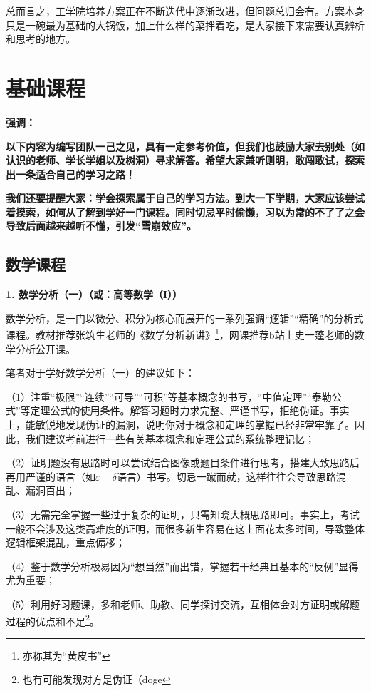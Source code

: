 \documentclass[11pt,oneside]{book}
\begin{document}
总而言之，工学院培养方案正在不断迭代中逐渐改进，但问题总归会有。方案本身只是一碗最为基础的大锅饭，加上什么样的菜拌着吃，是大家接下来需要认真辨析和思考的地方。


\section{基础课程}
\textbf{强调：}

\textbf{以下内容为编写团队一己之见，具有一定参考价值，但我们也鼓励大家去别处（如认识的老师、学长学姐以及树洞）寻求解答。希望大家兼听则明，敢闯敢试，探索出一条适合自己的学习之路！}

\textbf{我们还要提醒大家：学会探索属于自己的学习方法。到大一下学期，大家应该尝试着摸索，如何从了解到学好一门课程。同时切忌平时偷懒，习以为常的不了了之会导致后面越来越听不懂，引发“雪崩效应”。}


\subsection{数学课程}
\textbf{1. 数学分析（一）（或：高等数学（I））}

数学分析，是一门以微分、积分为核心而展开的一系列强调“逻辑”“精确”的分析式课程。教材推荐张筑生老师的《数学分析新讲》\footnote{亦称其为“黄皮书”}，网课推荐b站上史一蓬老师的数学分析公开课。

\vspace{10pt}

笔者对于学好数学分析（一）的建议如下：

（1）注重“极限”“连续”“可导”“可积”等基本概念的书写，“中值定理”“泰勒公式”等定理公式的使用条件。解答习题时力求完整、严谨书写，拒绝伪证。事实上，能敏锐地发现伪证的漏洞，说明你对于概念和定理的掌握已经非常牢靠了。因此，我们建议考前进行一些有关基本概念和定理公式的系统整理记忆；

（2）证明题没有思路时可以尝试结合图像或题目条件进行思考，搭建大致思路后再用严谨的语言（如$\varepsilon-\delta$语言）书写。切忌一蹴而就，这样往往会导致思路混乱、漏洞百出；

（3）无需完全掌握一些过于复杂的证明，只需知晓大概思路即可。事实上，考试一般不会涉及这类高难度的证明，而很多新生容易在这上面花太多时间，导致整体逻辑框架混乱，重点偏移；

（4）鉴于数学分析极易因为“想当然”而出错，掌握若干经典且基本的“反例”显得尤为重要；

（5）利用好习题课，多和老师、助教、同学探讨交流，互相体会对方证明或解题过程的优点和不足\footnote{也有可能发现对方是伪证（doge}。

\vspace{10pt}
\end{document}

